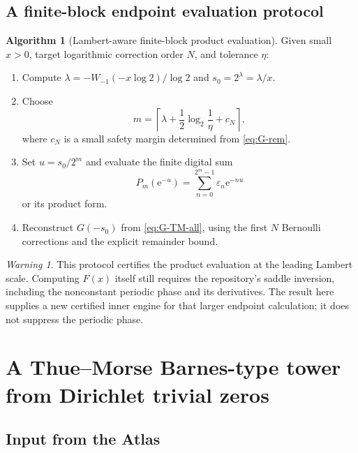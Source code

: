 \documentclass[11pt,oneside]{article}
\numberwithin{equation}{section}
\theoremstyle{definition}
\newtheorem{algorithm}[theorem]{Algorithm}
\theoremstyle{remark}
\newtheorem{warning}[theorem]{Warning}
\newcommand{\e}{\mathrm e}
\newcommand{\eps}{\varepsilon}
\begin{document}
\subsection{A finite-block endpoint evaluation protocol}

\begin{algorithm}[Lambert-aware finite-block product evaluation]
\label{alg:Lambert}
Given small $x>0$, target logarithmic correction order $N$, and tolerance $\eta$:
\begin{enumerate}
\item Compute $\lambda=-W_{-1}(-x\log2)/\log2$ and $s_0=2^\lambda=\lambda/x$.
\item Choose
\[
 m=\left\lceil\lambda+\frac12\log_2\frac1\eta+c_N\right\rceil,
\]
where $c_N$ is a small safety margin determined from \eqref{eq:G-rem}.
\item Set $u=s_0/2^m$ and evaluate the finite digital sum
\[
 P_m(\e^{-u})=\sum_{n=0}^{2^m-1}\eps_n\e^{-nu}
\]
or its product form.
\item Reconstruct $G(-s_0)$ from \eqref{eq:G-TM-all}, using the first $N$ Bernoulli
corrections and the explicit remainder bound.
\end{enumerate}
\end{algorithm}

\begin{warning}
This protocol certifies the product evaluation at the leading Lambert scale.  Computing
$F(x)$ itself still requires the repository's saddle inversion, including the nonconstant
periodic phase and its derivatives.  The result here supplies a new certified inner engine
for that larger endpoint calculation; it does not suppress the periodic phase.
\end{warning}

\section{A Thue--Morse Barnes-type tower from Dirichlet trivial zeros}
\label{sec:gamma-tower}

\subsection{Input from the Atlas}
\end{document}
